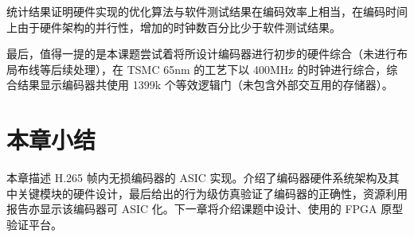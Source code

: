 统计结果证明硬件实现的优化算法与软件测试结果在编码效率上相当，在编码时间上由于硬件架构的并行性，增加的时钟数百分比少于软件测试结果。

最后，值得一提的是本课题尝试着将所设计编码器进行初步的硬件综合（未进行布局布线等后续处理），在 TSMC 65nm 的工艺下以 400MHz 的时钟进行综合，综合结果显示编码器共使用 1399k 个等效逻辑门（未包含外部交互用的存储器）。

\section{本章小结}
本章描述 H.265 帧内无损编码器的 ASIC 实现。介绍了编码器硬件系统架构及其中关键模块的硬件设计，最后给出的行为级仿真验证了编码器的正确性，资源利用报告亦显示该编码器可 ASIC 化。下一章将介绍课题中设计、使用的 FPGA 原型验证平台。